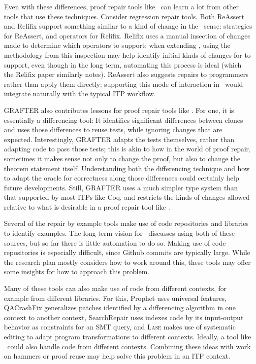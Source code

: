 Even with these differences, proof repair tools like \sysname\ can learn a lot from other tools that use these techniques.
Consider regression repair tools. %
Both ReAssert and Relifix support something similar to a kind of change in the \sysname\ sense:
strategies for ReAssert, and operators for Relifix. Relifix uses a manual insection of changes made to determine which operators to support;
when extending \sysname, using the methodology from this inspection may help identify initial kinds of changes for \sysname to support, even though
in the long term, automating this process is ideal (which the Relifix paper similarly notes).
ReAssert also suggests repairs to programmers rather than apply them directly; %
supporting this mode of interaction in \sysname\ would integrate
naturally with the typical ITP workflow.

GRAFTER also contributes lessons for proof repair tools like \sysname.
For one, it is essentially a differencing tool: It identifies significant differences between clones and uses those differences
to reuse tests, while ignoring changes that are expected. Interestingly, GRAFTER adapts the tests themselves, rather than adapting code to pass
those tests; this is akin to how in the world of proof repair, sometimes it makes sense not only to change the proof,
but also to change the theorem statement itself. Understanding both the differencing technique and how to adapt the oracle for correctness
along those differences could certainly help future developments.
Still, GRAFTER uses a much simpler type system than that supported by most ITPs like Coq, and restricts the kinds of changes allowed relative to what
is desirable in a proof repair tool like \sysname. %

Several of the repair by example tools make use of code repositories and libraries to identify examples.
The long-term vision for \sysname\ discusses using both of these sources, but so far there is little automation
to do so. Making use of code repositories is especially difficult, since Github commits are typically large.
While the research plan mostly considers how to work around this, %
these tools may offer some insights for how to approach this problem.

Many of these tools can also make use of code from different contexts, for example from different libraries. %
For this, Prophet uses universal features, QACrashFix generalizes patches identified by a differencing algorithm in one context to another context,
SearchRepair uses indexes code by its input-output behavior as constraints for an SMT query,
and \textsc{Lase} makes use of systematic editing to adapt program transformations to different contexts.
Ideally, a tool like \sysname\ could also handle code from different contexts. %
Combining these ideas with work on hammers or proof reuse may help solve this problem
in an ITP context.

